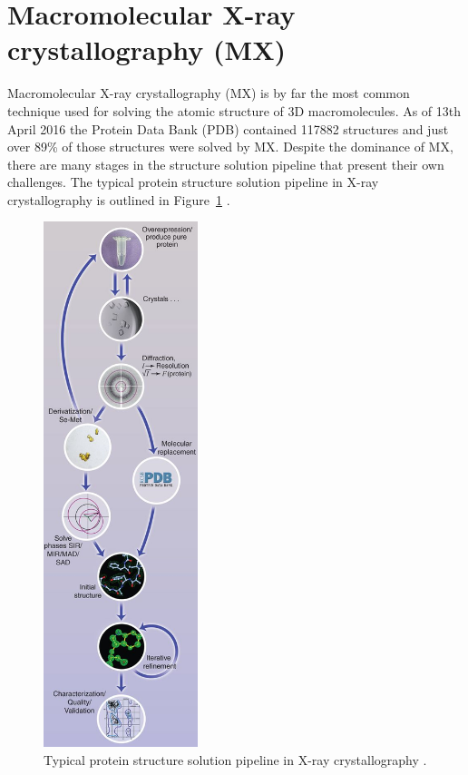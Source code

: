\section{Macromolecular X-ray crystallography (MX)}
\label{sec:X-ray crystallography}

    Macromolecular X-ray crystallography (MX) is by far the most common technique used for solving the atomic structure of 3D macromolecules.
    As of 13th April 2016 the Protein Data Bank (PDB) contained 117882 structures and just over 89\% of those structures were solved by MX.
    Despite the dominance of MX, there are many stages in the structure solution pipeline that present their own challenges.
    The typical protein structure solution pipeline in X-ray crystallography is outlined in Figure~\ref{fig:Crystallography-pipeline} \cite{garman2014}.

    \begin{figure}
        \centering
        \includegraphics[width=0.4\textwidth]{figures/introduction/crystallography_pipeline.jpg}
        \caption[MX structure solution pipeline.]{Typical protein structure solution pipeline in X-ray crystallography \cite{garman2014}.}
        \label{fig:Crystallography-pipeline}
    \end{figure}

